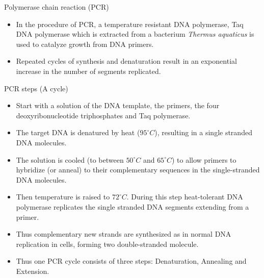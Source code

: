 \documentclass[11pt,dvipsnames,ignorenonframetext,aspectratio=169]{beamer}
\providecommand{\tightlist}{%
  \setlength{\itemsep}{0pt}\setlength{\parskip}{0pt}}
\begin{document}
\begin{frame}{Polymerase chain reaction (PCR)}
\protect\hypertarget{polymerase-chain-reaction-pcr}{}

\begin{itemize}
\tightlist
\item
  In the procedure of PCR, a temperature resistant DNA polymerase, Taq
  DNA polymerase which is extracted from a bacterium \emph{Thermus
  aquaticus} is used to catalyze growth from DNA primers.
\item
  Repeated cycles of synthesis and denaturation result in an exponential
  increase in the number of segments replicated.
\end{itemize}

\end{frame}

\begin{frame}{PCR steps (A cycle)}
\protect\hypertarget{pcr-steps-a-cycle}{}

\begin{itemize}
\tightlist
\item
  Start with a solution of the DNA template, the primers, the four
  deoxyribonucleotide triphosphates and Taq polymerase.
\item
  The target DNA is denatured by heat (\(95^\circ C\)), resulting in a
  single stranded DNA molecules.
\item
  The solution is cooled (to between \(50^\circ C\) and \(65^\circ C\))
  to allow primers to hybridize (or anneal) to their complementary
  sequences in the single-stranded DNA molecules.
\item
  Then temperature is raised to \(72^\circ C\). During this step
  heat-tolerant DNA polymerase replicates the single stranded DNA
  segments extending from a primer.
\item
  Thus complementary new strands are synthesized as in normal DNA
  replication in cells, forming two double-stranded molecule.
\item
  Thus one PCR cycle consists of three steps: Denaturation, Annealing
  and Extension.
\end{itemize}

\end{frame}
\end{document}
